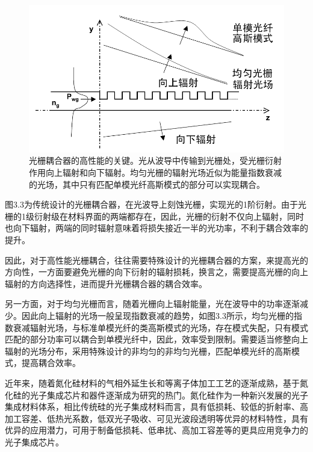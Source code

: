 \begin{figure}[!htbp]
    \centering
    \includegraphics[width=1\textwidth]{Img/3-3.png}
    \caption{光栅耦合器的高性能的关键。光从波导中传输到光栅处，受光栅衍射作用向上辐射和向下辐射。均匀光栅的辐射光场近似为能量指数衰减的光场，其中只有匹配单模光纤高斯模式的部分可以实现耦合。}
    \label{fig:3-3}
\end{figure}

图3.3为传统设计的光栅耦合器，在光波导上刻蚀光栅，实现光的1阶衍射。由于光栅的1级衍射级在材料界面的两端都存在，因此，光栅的衍射不仅向上辐射，同时也向下辐射，两端的同时辐射意味着将损失接近一半的光功率，不利于耦合效率的提升。

因此，对于高性能光栅耦合，往往需要特殊设计的光栅耦合器的方案，来提高光的方向性，一方面要避免光栅的向下衍射的辐射损耗，换言之，需要提高光栅的向上辐射的方向选择性，进而提升光栅耦合器的耦合效率。

另一方面，对于均匀光栅而言，随着光栅向上辐射能量，光在波导中的功率逐渐减少。因此向上辐射的光场一般呈现指数衰减的趋势，如图3.3所示，均匀光栅的指数衰减辐射光场，与标准单模光纤的类高斯模式的光场，存在模式失配，只有模式匹配的部分功率可以耦合到单模光纤中，因此，效率受到限制。需要适当修整向上辐射的光场分布，采用特殊设计的非均匀的非均匀光栅，匹配单模光纤的高斯模式，提高耦合效率。

近年来，随着氮化硅材料的气相外延生长和等离子体加工工艺的逐渐成熟，基于氮化硅的光子集成芯片和器件逐渐成为研究的热门。氮化硅作为一种新兴发展的光子集成材料体系，相比传统硅的光子集成材料而言，具有低损耗、较低的折射率、高加工容差、低热光系数，低双光子吸收、可见光波段透明等优异的材料特性，具有优异的应用潜力，可用于制备低损耗、低串扰、高加工容差等的更具应用竞争力的光子集成芯片。\cite{Yang2016Ultra,Subramanian2016Silicon,Rahim2017Expanding,Mu2017Silicon}


